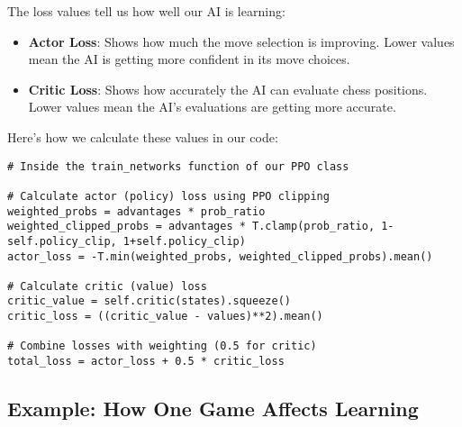 \documentclass[11pt]{article}
\begin{document}
The loss values tell us how well our AI is learning:

\begin{itemize}
    \item \textbf{Actor Loss}: Shows how much the move selection is improving. Lower values mean the AI is getting more confident in its move choices.
    \item \textbf{Critic Loss}: Shows how accurately the AI can evaluate chess positions. Lower values mean the AI's evaluations are getting more accurate.
\end{itemize}

Here's how we calculate these values in our code:

\begin{tcolorbox}[colback=green!5!white,colframe=green!75!black,title=Calculating Neural Network Loss]
\begin{lstlisting}[style=Python]
# Inside the train_networks function of our PPO class

# Calculate actor (policy) loss using PPO clipping
weighted_probs = advantages * prob_ratio
weighted_clipped_probs = advantages * T.clamp(prob_ratio, 1-self.policy_clip, 1+self.policy_clip)
actor_loss = -T.min(weighted_probs, weighted_clipped_probs).mean()

# Calculate critic (value) loss
critic_value = self.critic(states).squeeze()
critic_loss = ((critic_value - values)**2).mean()

# Combine losses with weighting (0.5 for critic)
total_loss = actor_loss + 0.5 * critic_loss
\end{lstlisting}
\end{tcolorbox}

\subsection{Example: How One Game Affects Learning}
\end{document}
